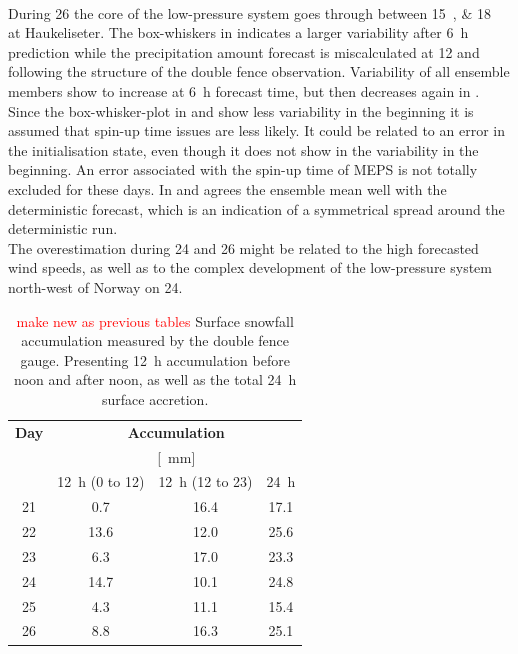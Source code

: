 \\
During \SI{26}{\dec} the core of the low-pressure system goes through between \SIlist{15;18}{\UTC} at Haukeliseter. The box-whiskers in  indicates a larger variability after \SI{6}{\hour} prediction while the precipitation amount forecast is miscalculated at \SI{12}{\UTC} and following the structure of the double fence observation. Variability of all ensemble members show to increase at \SI{6}{\hour} forecast time, but then decreases again in .  
\\
Since the box-whisker-plot in  and  show less variability in the beginning it is assumed that spin-up time issues are less likely. It could be related to an error in the initialisation state, even though it does not show in the variability in the beginning. An error associated with the spin-up time of MEPS is not totally excluded for these days. In  and  agrees the ensemble mean well with the deterministic forecast, which is an indication of a symmetrical spread around the deterministic run. 
\\ 
The overestimation during \num{24} and \SI{26}{\dec} might be related to the high forecasted wind speeds, as well as to the complex development of the low-pressure system north-west of Norway on \SI{24}{\dec}.
\\
\begin{table}[h]
	\begin{center}
		\caption{\textcolor{red}{make new as previous tables} Surface snowfall accumulation measured by the double fence gauge. Presenting \SI{12}{\hour} accumulation before noon and after noon, as well as the total \SI{24}{\hour} surface accretion. }\label{tab:sfc_acc}
		\begin{tabular}{c|c|c|c}
			\hline \hline
			\textbf{Day} & \multicolumn{3}{c}{\textbf{Accumulation}} \\ 
			& \multicolumn{3}{c}{[\SI{}{\mm}]} \\ \hline
			& \SI{12}{\hour} (\footnotesize{\num{0} to \SI{12}{\UTC}}) & \SI{12}{\hour} (\footnotesize{\num{12} to \SI{23}{\UTC}}) & \SI{24}{\hour} \\ \hline \hline
			\SI{21}{\dec} & \num{0.7} &  \num{16.4} & \num{17.1} \\ \hline
			\SI{22}{\dec} & \num{13.6} &  \num{12.0} & \num{25.6} \\ \hline
			\SI{23}{\dec} & \num{6.3} &  \num{17.0} & \num{23.3} \\ \hline
			\SI{24}{\dec} & \num{14.7} &  \num{10.1} & \num{24.8} \\ \hline
			\SI{25}{\dec} & \num{4.3} &  \num{11.1} & \num{15.4} \\ \hline
			\SI{26}{\dec} & \num{8.8} &  \num{16.3} & \num{25.1} \\ 
			\hline \hline
		\end{tabular}
	\end{center}
\end{table}
